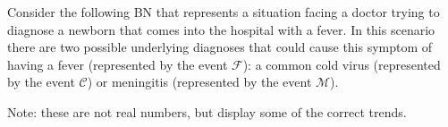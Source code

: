 \documentclass{tufte-handout}
\begin{document}
\begin{exercise}
Consider the following BN that represents a situation facing a doctor trying to diagnose a newborn that comes into the hospital with a fever.  In this scenario there are two possible underlying diagnoses that could cause this symptom of having a fever (represented by the event $\mathcal{F}$): a common cold virus (represented by the event $\mathcal{C}$) or meningitis (represented by the event $\mathcal{M}$).

Note: these are not real numbers, but display some of the correct trends.


\end{exercise}
\end{document}
